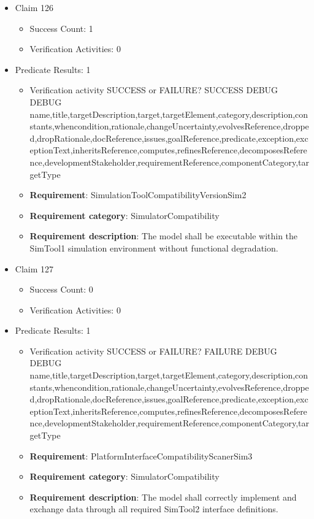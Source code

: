 \documentclass{article}
\begin{document}
\begin{itemize}
  				  \item Claim 126
				\begin{itemize}
			    	\item Success Count: 1 
			    	\item Verification Activities: 0
				\end{itemize}
				
									    
				\item Predicate Results: 1
					\begin{itemize}				
					\item Verification activity SUCCESS or FAILURE? SUCCESS
					DEBUG DEBUG name,title,targetDescription,target,targetElement,category,description,constants,whencondition,rationale,changeUncertainty,evolvesReference,dropped,dropRationale,docReference,issues,goalReference,predicate,exception,exceptionText,inheritsReference,computes,refinesReference,decomposesReference,developmentStakeholder,requirementReference,componentCategory,targetType
					\item \textbf{Requirement}: SimulationToolCompatibilityVersionSim2 
					\item \textbf{Requirement category}: SimulatorCompatibility
					\item \textbf{Requirement description}: The model shall be executable within the SimTool1 simulation environment without functional degradation.
					\end{itemize}

  				  \item Claim 127
				\begin{itemize}
			    	\item Success Count: 0 
			    	\item Verification Activities: 0
				\end{itemize}
				
									    
				\item Predicate Results: 1
					\begin{itemize}				
					\item Verification activity SUCCESS or FAILURE? FAILURE
					DEBUG DEBUG name,title,targetDescription,target,targetElement,category,description,constants,whencondition,rationale,changeUncertainty,evolvesReference,dropped,dropRationale,docReference,issues,goalReference,predicate,exception,exceptionText,inheritsReference,computes,refinesReference,decomposesReference,developmentStakeholder,requirementReference,componentCategory,targetType
					\item \textbf{Requirement}: PlatformInterfaceCompatibilityScanerSim3 
					\item \textbf{Requirement category}: SimulatorCompatibility
					\item \textbf{Requirement description}: The model shall correctly implement and exchange data through all required SimTool2 interface definitions.
					\end{itemize}


\end{itemize}
\end{document}

